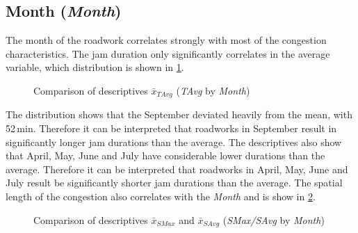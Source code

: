 \subsection{Month (\textit{Month})}
The month of the roadwork correlates strongly with most of the congestion characteristics. The jam duration only significantly correlates in the average variable, which distribution is shown in \cref{fig:arbis_summary_month_duration}.
\begin{figure}[ht!]
	\data
	\pgfplotstablesort[sort key=gMeanSAvg, sort cmp=float >]{\datasorted}{\data}
	\tiny
	\centering
	\caption{Comparison of descriptives $\bar{x}_{TAvg}$ (\textit{TAvg} by \textit{Month})}
	\label{fig:arbis_summary_month_duration}
\end{figure}
The distribution shows that the September deviated heavily from the mean, with 52\,min. Therefore it can be interpreted that roadworks in September result in significantly longer jam durations than the average. The descriptives also show that April, May, June and July have considerable lower durations than the average. Therefore it can be interpreted that roadworks in April, May, June and July result be significantly shorter jam durations than the average. The spatial length of the congestion also correlates with the \textit{Month} and is show in \cref{fig:arbis_matched_meancomparison_month_spatial}.
\begin{figure}[ht!]
	\data
	\pgfplotstablesort[sort key=means, sort cmp=float >]{\datasorted}{\data}
	\tiny
	\centering
	\caption{Comparison of descriptives $\bar{x}_{SMax}$ and $\bar{x}_{SAvg}$ (\textit{SMax/SAvg} by \textit{Month})}
	\label{fig:arbis_matched_meancomparison_month_spatial}
\end{figure}
